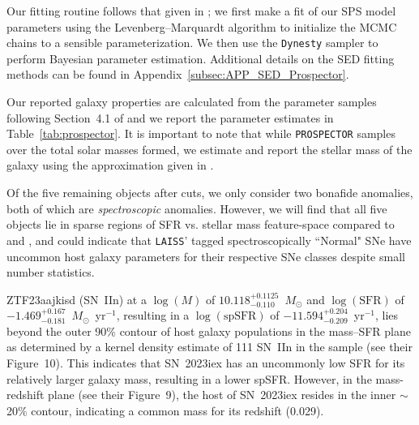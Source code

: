 \documentclass[twocolumn]{aastex63}
\newcommand{\laiss}{\texttt{LAISS}}
\begin{document}

Our fitting routine follows that given in \citet{ProspectorAlphaLeja2017}; we first make a fit of our SPS model parameters using the Levenberg–Marquardt algorithm \citep{More1978} to initialize the MCMC chains to a sensible parameterization. We then use the \texttt{Dynesty} sampler to perform Bayesian parameter estimation.  Additional details on the SED fitting methods can be found in Appendix~\ref{subsec:APP_SED_Prospector}. \par 

Our reported galaxy properties are calculated from the parameter samples following Section~4.1 of \cite{GRBParameterDefinitionsNugent2020} and we report the parameter estimates in Table~\ref{tab:prospector}. It is important to note that while \texttt{PROSPECTOR} samples over the total solar masses formed, we estimate and report the stellar mass of the galaxy using the approximation given in \cite{Leja_2013}. \par



Of the five remaining objects after cuts, we only consider two bonafide anomalies, both of which are \emph{spectroscopic} anomalies. However, we will find that all five objects lie in sparse regions of SFR vs. stellar mass feature-space compared to \cite{PalomarHostModelingSchulze2021} and \cite{Sharma2023}, and could indicate that \laiss{}' tagged spectroscopically ``Normal" SNe have uncommon host galaxy parameters for their respective SNe classes despite small number statistics. \par

ZTF23aajkisd (SN~IIn) at a $\log(M)$ of $10.118^{+0.1125}_{-0.110}$~$M_{\odot}$ and $\log(\text{SFR})$ of $-1.469^{+0.167}_{-0.181}$~$M_{\odot}$~yr$^{-1}$, resulting in a $\log(\text{spSFR})$ of $-11.594^{+0.204}_{-0.209}$~yr$^{-1}$, lies beyond the outer 90\% contour of host galaxy populations in the mass–SFR plane as determined by a kernel density estimate of 111 SN~IIn in the \cite{PalomarHostModelingSchulze2021} sample (see their Figure~10). This indicates that SN~2023iex has an uncommonly low SFR for its relatively larger galaxy mass, resulting in a lower spSFR. However, in the mass-redshift plane (see their Figure~9), the host of SN~2023iex resides in the inner $\sim$20\% contour, indicating a common mass for its redshift (0.029).  \par
\end{document}
